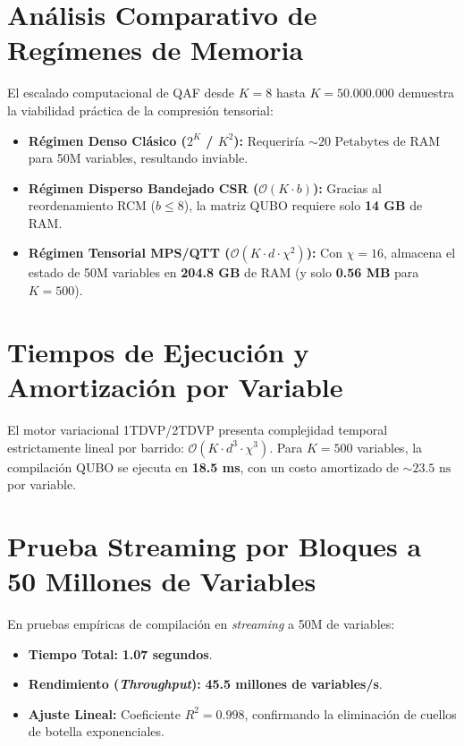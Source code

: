 \documentclass[11pt,a4paper,oneside]{report}
\begin{document}
\section{Análisis Comparativo de Regímenes de Memoria}
El escalado computacional de QAF desde $K = 8$ hasta $K = 50.000.000$ demuestra la viabilidad práctica de la compresión tensorial:
\begin{itemize}
    \item \textbf{Régimen Denso Clásico ($2^K$ / $K^2$):} Requeriría $\sim 20\text{ Petabytes}$ de RAM para 50M variables, resultando inviable.
    \item \textbf{Régimen Disperso Bandejado CSR ($\mathcal{O}(K \cdot b)$):} Gracias al reordenamiento RCM ($b \le 8$), la matriz QUBO requiere solo \textbf{14 GB} de RAM.
    \item \textbf{Régimen Tensorial MPS/QTT ($\mathcal{O}(K \cdot d \cdot \chi^2)$):} Con $\chi = 16$, almacena el estado de 50M variables en \textbf{204.8 GB} de RAM (y solo \textbf{0.56 MB} para $K=500$).
\end{itemize}

\section{Tiempos de Ejecución y Amortización por Variable}
El motor variacional 1TDVP/2TDVP presenta complejidad temporal estrictamente lineal por barrido: $\mathcal{O}(K \cdot d^3 \cdot \chi^3)$.
Para $K = 500$ variables, la compilación QUBO se ejecuta en \textbf{18.5 ms}, con un costo amortizado de $\sim 23.5\text{ ns}$ por variable.

\section{Prueba Streaming por Bloques a 50 Millones de Variables}
En pruebas empíricas de compilación en \emph{streaming} a 50M de variables:
\begin{itemize}
    \item \textbf{Tiempo Total:} \textbf{1.07 segundos}.
    \item \textbf{Rendimiento (\emph{Throughput}):} \textbf{45.5 millones de variables/s}.
    \item \textbf{Ajuste Lineal:} Coeficiente $R^2 = 0.998$, confirmando la eliminación de cuellos de botella exponenciales.
\end{itemize}


\end{document}
